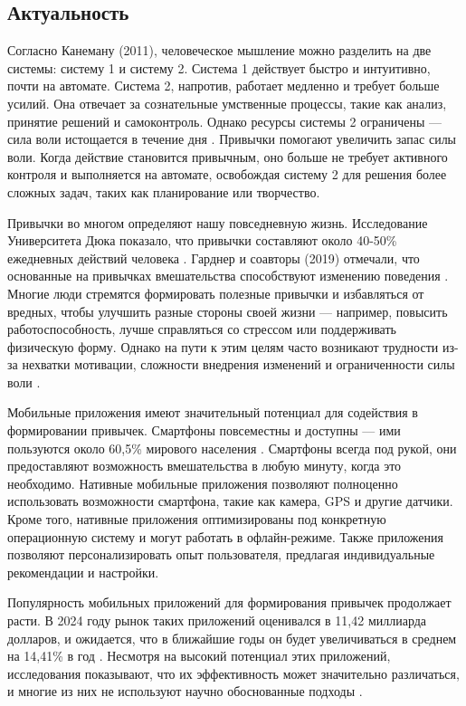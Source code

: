 \documentclass[pdflatex,sn-mathphys-num]{sn-jnl}%
\theoremstyle{thmstyleone}%
\theoremstyle{thmstyletwo}%
\theoremstyle{thmstylethree}%
\begin{document}
\subsection{Актуальность}\label{Relevance}

Согласно Канеману (2011), человеческое мышление можно разделить на две системы: систему 1 и систему 2. Система 1 действует быстро и интуитивно, почти на автомате. Система 2, напротив, работает медленно и требует больше усилий. Она отвечает за сознательные умственные процессы, такие как анализ, принятие решений и самоконтроль. Однако ресурсы системы 2 ограничены — сила воли истощается в течение дня \cite{kahneman_thinking_2011}. Привычки помогают увеличить запас силы воли. Когда действие становится привычным, оно больше не требует активного контроля и выполняется на автомате, освобождая систему 2 для решения более сложных задач, таких как планирование или творчество.

Привычки во многом определяют нашу повседневную жизнь. Исследование Университета Дюка показало, что привычки составляют около 40-50\% ежедневных действий человека \cite{wood_habits_2002}. Гарднер и соавторы (2019) отмечали, что основанные на привычках вмешательства способствуют изменению поведения \cite{gardner_habit_2019}. Многие люди стремятся формировать полезные привычки и избавляться от вредных, чтобы улучшить разные стороны своей жизни — например, повысить работоспособность, лучше справляться со стрессом или поддерживать физическую форму. Однако на пути к этим целям часто возникают трудности из-за нехватки мотивации, сложности внедрения изменений и ограниченности силы воли \cite{gardner_making_2012, noauthor_what_nodate}.

Мобильные приложения имеют значительный потенциал для содействия в формировании привычек. Смартфоны повсеместны и доступны — ими пользуются около 60,5\% мирового населения \cite{gill_how_2025}. Смартфоны всегда под рукой, они предоставляют возможность вмешательства в любую минуту, когда это необходимо. Нативные мобильные приложения позволяют полноценно использовать возможности смартфона, такие как камера, GPS и другие датчики. Кроме того, нативные приложения  оптимизированы под конкретную операционную систему и могут работать в офлайн-режиме. Также приложения позволяют персонализировать опыт пользователя, предлагая индивидуальные рекомендации и настройки.

Популярность мобильных приложений для формирования привычек продолжает расти. В 2024 году рынок таких приложений оценивался в 11,42 миллиарда долларов, и ожидается, что в ближайшие годы он будет увеличиваться в среднем на 14,41\% в год \cite{httpswwweconmarketresearchcom_habit_nodate}. Несмотря на высокий потенциал этих приложений, исследования показывают, что их эффективность может значительно различаться, и многие из них не используют научно обоснованные подходы \cite{lally_how_2010, stawarz_beyond_2015}.
\end{document}
